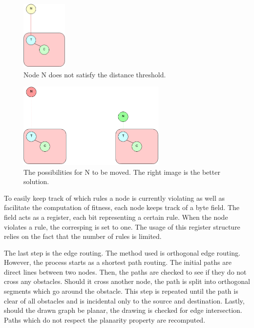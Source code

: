 \begin{figure}[ht] \centering
\includegraphics[width=0.2\textwidth]{img/algdesing/recombination.png}
\caption{Node N does not satisfy the distance threshold. \label{rec1}} \end{figure}

\begin{figure}[ht] \centering
\includegraphics[width=0.65\textwidth]{img/algdesing/recombinationposib.png}
\caption{The possibilities for N to be moved. The right image is the better solution. \label{rec2}} \end{figure}

To easily keep track of which rules a node is currently violating as well as facilitate the computation of fitness, each node keeps track of a byte field. 
The field acts as a register, each bit representing a certain rule. When the node violates a rule, the corresping is set to one. The usage of this register
structure relies on the fact that the number of rules is limited.

The last step is the edge routing. The method used is orthogonal edge routing. However, the process starts as a shortest path routing. The initial paths 
are direct lines between two nodes. Then, the paths are checked to see if they do not cross any obstacles. Should it cross another node, the path is split 
into orthogonal segments which go around the obstacle. This step is repeated until the path is clear of all obstacles and is incidental only to the source and 
destination. Lastly, should the drawn graph be planar, the drawing is checked for edge intersection. Paths which do not respect the planarity property 
are recomputed.
